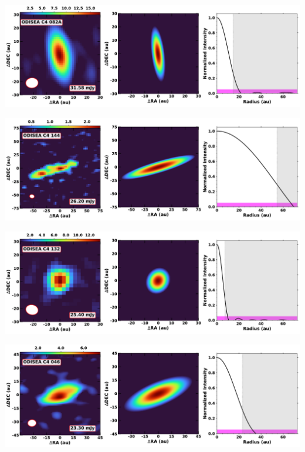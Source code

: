 \vspace{0pt}
\begin{minipage}{.49\textwidth}
	 \centering
	 	 \hrulesep
	 	 \includegraphics[width=1\linewidth]{pdf/0+I_F/038_odisea_c4_082a_cutout.pdf}
\end{minipage}%
\vrulesep
\begin{minipage}{.49\textwidth}
	 \centering
	 	 \hrulesep
	 	 \includegraphics[width=1\linewidth]{pdf/0+I_F/035_odisea_c4_144_cutout.pdf}
\end{minipage}%
\vspace{0pt}
\begin{minipage}{.49\textwidth}
	 \centering
	 	 \hrulesep
	 	 \includegraphics[width=1\linewidth]{pdf/0+I_F/034_odisea_c4_132_cutout.pdf}
\end{minipage}%
\vrulesep
\begin{minipage}{.49\textwidth}
	 \centering
	 	 \hrulesep
	 	 \includegraphics[width=1\linewidth]{pdf/0+I_F/030_odisea_c4_046_cutout.pdf}
\end{minipage}%
